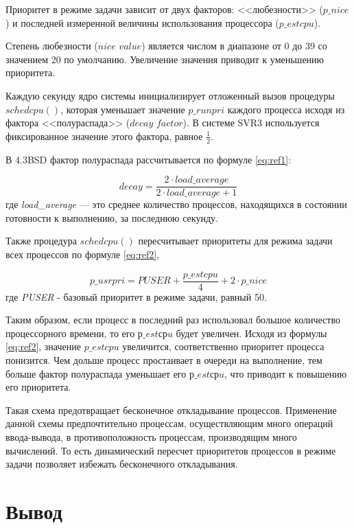 Приоритет в режиме задачи зависит от двух факторов: <<любезности>> ($p\_nice$) и последней измеренной величины использования процессора ($p\_estcpu$). 

Степень любезности ($nice$ $value$) является числом в диапазоне от 0 до 39 со значением 20 по умолчанию. Увеличение значения приводит к уменьшению приоритета.

Каждую секунду ядро системы инициализирует отложенный вызов процедуры $schedcpu()$, которая уменьшает значение $p\_runpri$ каждого процесса исходя из фактора <<полураспада>> ($decay$ $factor$). В системе SVR3 используется фиксированное значение этого фактора, равное $\frac{1}{2}$.

В 4.3BSD фактор полураспада рассчитывается по формуле \ref{eq:ref1}:

\begin{equation}
	\label{eq:ref1}
	decay = \frac{2 \cdot load\_average}{2 \cdot load\_average + 1}
\end{equation} 
где \textit{load\_average} --- это среднее количество процессов, находящихся в состоянии готовности к выполнению, за последнюю секунду.

\clearpage

Также процедура $schedcpu()$ пересчитывает приоритеты для режима задачи всех процессов по формуле \ref{eq:ref2},

\begin{equation}
	\label{eq:ref2}
	p\_usrpri = PUSER + \frac{p\_estcpu}{4} + 2 \cdot p\_nice
\end{equation}где \textit{PUSER} - базовый приоритет в режиме задачи, равный 50.

Таким образом, если процесс в последний раз использовал большое количество процессорного времени, то его $р\_estсрu$ будет увеличен. Исходя из формулы \ref{eq:ref2}, значение $p\_estcpu$ увеличится, соответственно приоритет процесса понизится.  
Чем дольше процесс простаивает в очереди на выполнение, тем больше фактор полураспада уменьшает его $р\_estсрu$, что приводит к повышению его приоритета. 

Такая схема предотвращает бесконечное откладывание процессов. 
Применение данной схемы предпочтительно процессам, осуществляющим много операций ввода-вывода, в противоположность процессам, производящим много вычислений. 
То есть динамический пересчет приоритетов процессов в режиме задачи позволяет избежать бесконечного откладывания.


\chapter*{Вывод}

